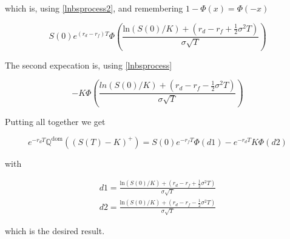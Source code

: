 \documentclass{amsart}
\theoremstyle{plain}
\numberwithin{equation}{section}
\begin{document}
which is, using \eqref{lnbsprocess2}, and remembering $1-\Phi(x) = \Phi(-x)$

\begin{equation}
S(0)e^{(r_d-r_f)T} \Phi \left( \frac{\mathrm{ln}(S(0)/K)+(r_d-r_f+\frac{1}{2}\sigma^2T)}{\sigma\sqrt{T}} \right)
\end{equation}

The second expecation is, using \eqref{lnbsprocess}

\begin{equation}
-K\Phi\left(\frac{ln(S(0)/K)+(r_d-r_f-\frac{1}{2}\sigma^2T)}{\sigma\sqrt{T}}\right)
\end{equation}

Putting all together we get

\begin{equation}
e^{-r_dT}\mathrm{\mathbb{Q}^{dom}}((S(T)-K)^+) = S(0)e^{-r_f T}\Phi\left(d1\right)
-e^{-r_dT}K\Phi\left(d2\right)
\end{equation}

with

\begin{eqnarray}
d1 = \frac{\mathrm{ln}(S(0)/K)+(r_d-r_f+\frac{1}{2}\sigma^2T)}{\sigma\sqrt{T}} \\
d2 = \frac{\mathrm{ln}(S(0)/K)+(r_d-r_f-\frac{1}{2}\sigma^2T)}{\sigma\sqrt{T}}
\end{eqnarray}

which is the desired result.
\end{document}
